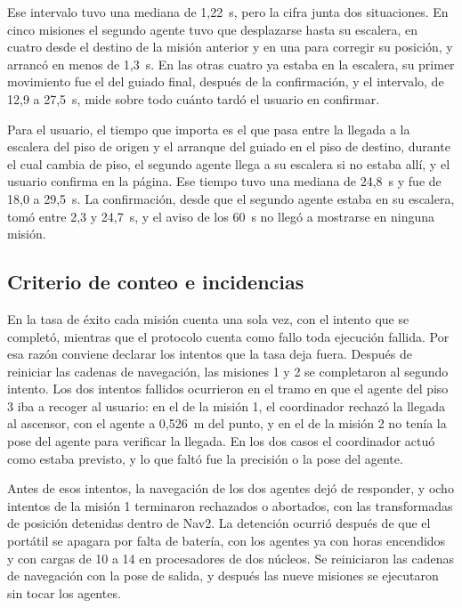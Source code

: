 Ese intervalo tuvo una mediana de 1,22~s, pero la cifra junta dos situaciones. En cinco misiones el segundo agente tuvo que desplazarse hasta su escalera, en cuatro desde el destino de la misión anterior y en una para corregir su posición, y arrancó en menos de 1,3~s. En las otras cuatro ya estaba en la escalera, su primer movimiento fue el del guiado final, después de la confirmación, y el intervalo, de 12,9 a 27,5~s, mide sobre todo cuánto tardó el usuario en confirmar.

Para el usuario, el tiempo que importa es el que pasa entre la llegada a la escalera del piso de origen y el arranque del guiado en el piso de destino, durante el cual cambia de piso, el segundo agente llega a su escalera si no estaba allí, y el usuario confirma en la página. Ese tiempo tuvo una mediana de 24,8~s y fue de 18,0 a 29,5~s. La confirmación, desde que el segundo agente estaba en su escalera, tomó entre 2,3 y 24,7~s, y el aviso de los 60~s no llegó a mostrarse en ninguna misión.

\subsection{Criterio de conteo e incidencias}

En la tasa de éxito cada misión cuenta una sola vez, con el intento que se completó, mientras que el protocolo cuenta como fallo toda ejecución fallida. Por esa razón conviene declarar los intentos que la tasa deja fuera. Después de reiniciar las cadenas de navegación, las misiones 1 y 2 se completaron al segundo intento. Los dos intentos fallidos ocurrieron en el tramo en que el agente del piso 3 iba a recoger al usuario: en el de la misión 1, el coordinador rechazó la llegada al ascensor, con el agente a 0,526~m del punto, y en el de la misión 2 no tenía la pose del agente para verificar la llegada. En los dos casos el coordinador actuó como estaba previsto, y lo que faltó fue la precisión o la pose del agente.

Antes de esos intentos, la navegación de los dos agentes dejó de responder, y ocho intentos de la misión 1 terminaron rechazados o abortados, con las transformadas de posición detenidas dentro de Nav2. La detención ocurrió después de que el portátil se apagara por falta de batería, con los agentes ya con horas encendidos y con cargas de 10 a 14 en procesadores de dos núcleos. Se reiniciaron las cadenas de navegación con la pose de salida, y después las nueve misiones se ejecutaron sin tocar los agentes.

